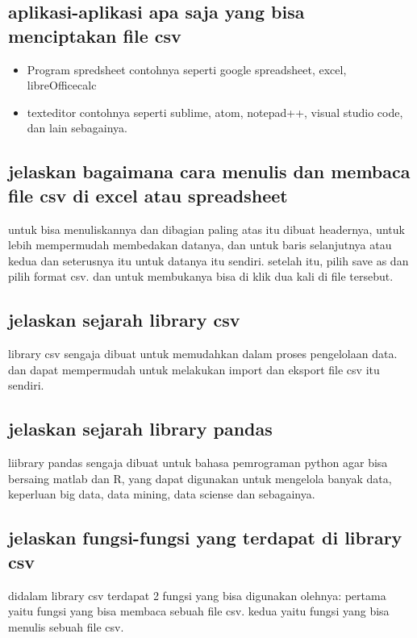 \subsection{aplikasi-aplikasi apa saja yang bisa menciptakan file csv }
\begin{itemize}
               \item Program spredsheet
               contohnya seperti google spreadsheet, excel, libreOfficecalc
               \item texteditor
               contohnya seperti sublime, atom, notepad++, visual studio code, dan lain sebagainya.
        \end{itemize}

\subsection{jelaskan bagaimana cara menulis dan membaca file csv di excel atau spreadsheet }
untuk bisa menuliskannya dan dibagian paling atas itu dibuat headernya, untuk lebih mempermudah membedakan datanya, dan untuk baris selanjutnya atau kedua dan seterusnya itu untuk datanya itu sendiri. setelah itu, pilih save as dan pilih format csv. dan untuk membukanya bisa di klik dua kali di file tersebut.

\subsection{ jelaskan sejarah library csv}
 library csv sengaja dibuat untuk memudahkan dalam proses pengelolaan data. dan dapat mempermudah untuk melakukan import dan eksport file csv itu sendiri.

\subsection{ jelaskan sejarah library pandas}
liibrary pandas sengaja dibuat untuk bahasa pemrograman python agar bisa bersaing matlab dan R, yang dapat digunakan untuk mengelola banyak data, keperluan big data, data mining, data sciense dan sebagainya. 

\subsection{jelaskan fungsi-fungsi yang terdapat di library csv}
didalam library csv terdapat 2 fungsi yang bisa digunakan olehnya:
        pertama yaitu fungsi yang bisa membaca sebuah file csv.
        kedua yaitu fungsi yang bisa menulis sebuah file csv.

